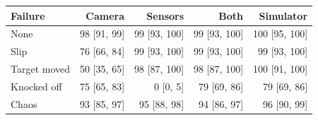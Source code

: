 \begin{tabular}{lrrrr}
\toprule
Failure & Camera & Sensors & Both & Simulator \\
\midrule
None & 98 [91, 99] & 99 [93, 100] & 99 [93, 100] & 100 [95, 100] \\
Slip & 76 [66, 84] & 99 [93, 100] & 99 [93, 100] & 99 [93, 100] \\
Target moved & 50 [35, 65] & 98 [87, 100] & 98 [87, 100] & 100 [91, 100] \\
Knocked off & 75 [65, 83] & 0 [0, 5] & 79 [69, 86] & 79 [69, 86] \\
Chaos & 93 [85, 97] & 95 [88, 98] & 94 [86, 97] & 96 [90, 99] \\
\bottomrule
\end{tabular}

